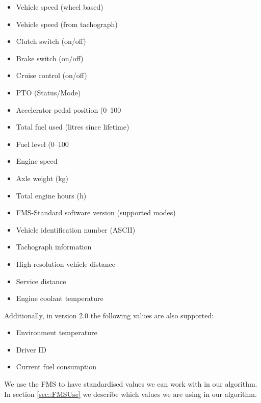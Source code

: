 \begin{itemize}
    \item Vehicle speed (wheel based)
    \item Vehicle speed (from tachograph)
    \item Clutch switch (on/off)
    \item Brake switch (on/off)
    \item Cruise control (on/off)
    \item PTO (Status/Mode)
    \item Accelerator pedal position (0–100%
    \item Total fuel used (litres since lifetime)
    \item Fuel level (0–100%
    \item Engine speed
    \item Axle weight (kg)
    \item Total engine hours (h)
    \item FMS-Standard software version (supported modes)
    \item Vehicle identification number (ASCII)
    \item Tachograph information
    \item High-resolution vehicle distance
    \item Service distance
    \item Engine coolant temperature
\end{itemize}

Additionally, in version 2.0 the following values are also supported:
\begin{itemize}
    \item Environment temperature
    \item Driver ID
    \item Current fuel consumption
\end{itemize}

We use the FMS to have standardised values we can work with in our algorithm. In section \ref{sec::FMSUse} we describe which values we are using in our algorithm.


\clearpage
